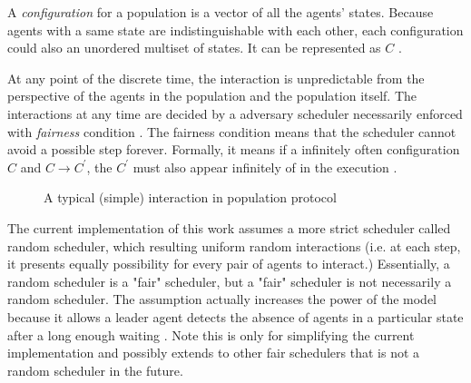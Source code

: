 \par\noindent
A \textit{configuration} for a population is a vector of all the agents' states.
Because agents with a same state are indistinguishable with each other, each configuration
could also an unordered multiset of states. It can be represented as $C$ \cite{AspnesR2007, MCS11}.


\par \label{IntroToPPFairScheduler} \noindent
At any point of the discrete time, the interaction is unpredictable from the perspective of the agents
in the population and the population itself. The interactions at any time are decided
by a adversary scheduler necessarily enforced with \textit{fairness} condition \cite{AspnesR2007, MCS11}.
The fairness condition means that the scheduler cannot avoid a possible step forever.
Formally, it means if a infinitely often configuration $C$ and $C \to C^{'}$,
the $C^{'}$ must also appear infinitely of in the execution \cite{AspnesR2007}.


\begin{figure}[H]
\begin{center}
\end{center}
\caption{A typical (simple) interaction in population protocol}
\end{figure}



\par\noindent
The current implementation of this work assumes a more strict scheduler called random scheduler,
which resulting uniform random interactions (i.e. at each step, it presents
equally possibility for every pair of agents to interact.) Essentially, a random scheduler is a "fair" scheduler, but a "fair" scheduler is not necessarily a random scheduler.
The assumption actually increases the power of the model because it allows a leader agent detects the absence
of agents in a particular state after a long enough waiting \cite{AspnesR2007}. Note this is only for
simplifying the current implementation and possibly extends to other fair schedulers that is not a
random scheduler in the future.

